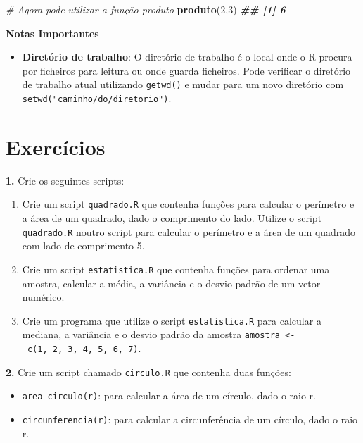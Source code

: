 \documentclass[
]{book}
\newenvironment{Shaded}{\begin{snugshade}}{\end{snugshade}}
\newcommand{\CommentTok}[1]{\textcolor[rgb]{0.56,0.35,0.01}{\textit{#1}}}
\newcommand{\DecValTok}[1]{\textcolor[rgb]{0.00,0.00,0.81}{#1}}
\newcommand{\DocumentationTok}[1]{\textcolor[rgb]{0.56,0.35,0.01}{\textbf{\textit{#1}}}}
\newcommand{\FunctionTok}[1]{\textcolor[rgb]{0.13,0.29,0.53}{\textbf{#1}}}
\newcommand{\NormalTok}[1]{#1}
\providecommand{\tightlist}{%
  \setlength{\itemsep}{0pt}\setlength{\parskip}{0pt}}
\begin{document}
\begin{Shaded}
\begin{Highlighting}[]
\CommentTok{\# Agora pode utilizar a função \textquotesingle{}produto\textquotesingle{}}
\FunctionTok{produto}\NormalTok{(}\DecValTok{2}\NormalTok{,}\DecValTok{3}\NormalTok{)}
\DocumentationTok{\#\# [1] 6}
\end{Highlighting}
\end{Shaded}

\textbf{Notas Importantes}

\begin{itemize}
\tightlist
\item
  \textbf{Diretório de trabalho}: O diretório de trabalho é o local onde o
  R procura por ficheiros para leitura ou onde guarda ficheiros. Pode
  verificar o diretório de trabalho atual utilizando \texttt{getwd()} e mudar
  para um novo diretório com \texttt{setwd("caminho/do/diretorio")}.
\end{itemize}

\section{Exercícios}\label{exercuxedcios-8}

\textbf{1.} Crie os seguintes scripts:

\begin{enumerate}
\def\labelenumi{(\alph{enumi})}
\item
  Crie um script \texttt{quadrado.R} que contenha funções para calcular o
  perímetro e a área de um quadrado, dado o comprimento do lado.
  Utilize o script \texttt{quadrado.R} noutro script para calcular o
  perímetro e a área de um quadrado com lado de comprimento 5.
\item
  Crie um script \texttt{estatistica.R} que contenha funções para ordenar uma
  amostra, calcular a média, a variância e o desvio padrão de um vetor
  numérico.
\item
  Crie um programa que utilize o script \texttt{estatistica.R} para calcular
  a mediana, a variância e o desvio padrão da amostra
  \texttt{amostra\ \textless{}-\ c(1,\ 2,\ 3,\ 4,\ 5,\ 6,\ 7)}.
\end{enumerate}

\textbf{2.} Crie um script chamado \texttt{circulo.R} que contenha duas funções:

\begin{itemize}
\item
  \texttt{area\_circulo(r)}: para calcular a área de um círculo, dado o raio r.
\item
  \texttt{circunferencia(r)}: para calcular a circunferência de um círculo, dado o raio r.
\end{itemize}
\end{document}

